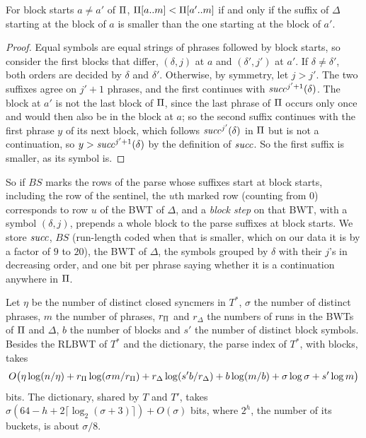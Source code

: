 \begin{lemma}
\label{lem:blockorder}
For block starts $a \ne a'$ of $\Pi$, $\Pi[a..m] < \Pi[a'..m]$ if and
only if the suffix of $\Delta$ starting at the block of $a$ is smaller
than the one starting at the block of $a'$.
\end{lemma}

\begin{proof}
Equal symbols are equal strings of phrases followed by block starts,
so consider the first blocks that differ, $(\delta, j)$ at $a$ and $(\delta', j')$
at $a'$. If $\delta \ne \delta'$, both orders are decided by $\delta$ and $\delta'$.
Otherwise, by symmetry, let $j > j'$. The two suffixes agree on $j' + 1$
phrases, and the first continues with $\mathit{succ}^{j'+1}(\delta)$. The block at
$a'$ is not the last block of $\Pi$, since the last phrase of $\Pi$
occurs only once and would then also be in the block at $a$; so the
second suffix continues with the first phrase $y$ of its next block,
which follows $\mathit{succ}^{j'}(\delta)$ in $\Pi$ but is not a continuation, so $y
> \mathit{succ}^{j'+1}(\delta)$ by the definition of $\mathit{succ}$. So the first suffix is smaller, as its symbol is.
\end{proof}

So if $BS$ marks the rows of the parse whose suffixes start at block
starts, including the row of the sentinel, the $u$th marked row
(counting from $0$) corresponds to row $u$ of the BWT of $\Delta$, and a \emph{block step} on that BWT, with a symbol $(\delta, j)$,
prepends a whole block to the parse suffixes at block starts. We store
$\mathit{succ}$, $BS$ (run-length coded when that is smaller, which on our
data it is by a factor of $9$ to $20$), the BWT of $\Delta$, the
symbols grouped by $\delta$ with their $j$'s in decreasing order, and one bit
per phrase saying whether it is a continuation anywhere in $\Pi$.

\begin{lemma}
\label{lem:space}
Let $\eta$ be the number of distinct closed syncmers in $T^*$, $\sigma$
the number of distinct phrases, $m$ the number of phrases, $r_\Pi$ and
$r_\Delta$ the numbers of runs in the BWTs of $\Pi$ and $\Delta$, $b$
the number of blocks and $s'$ the number of distinct block symbols.
Besides the RLBWT of $T^*$ and the dictionary, the parse index of $T^*$,
with blocks, takes
\[
O\bigl(\eta \log(n/\eta) + r_\Pi \log(\sigma m / r_\Pi) + r_\Delta
\log(s' b / r_\Delta) + b \log(m/b) + \sigma \log \sigma + s' \log m\bigr)
\]
bits. The dictionary, shared by $T$ and $T'$, takes $\sigma (64 - h + 2
\lceil \log_2 (\sigma + 3) \rceil) + O(\sigma)$ bits, where $2^h$, the
number of its buckets, is about $\sigma / 8$.
\end{lemma}

